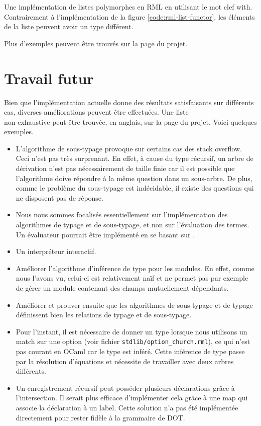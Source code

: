 \begin{listing}
  \inputminted{OCaml}{codes/list.rml}
  \caption{Une implémentation de listes polymorphes en RML en utilisant le mot
    clef with. Contrairement à l'implémentation de la figure
    \ref{code:rml-list-functor}, les éléments de la liste peuvent avoir un type
  différent.}
  \label{code:rml-list-with}
\end{listing}

Plus d'exemples peuvent être trouvés sur la page du projet.

\section{Travail futur}

Bien que l'implémentation actuelle donne des résultats satisfaisants sur
différents cas, diverses améliorations peuvent être effectuées. Une liste \\
non-exhaustive peut être trouvée, en anglais, sur la page du
projet\cite{rml-github-issues}. Voici quelques exemples.

\begin{itemize}
  \item L'algorithme de sous-typage provoque sur certains cas des stack
    overflow. Ceci n'est pas très surprenant. En effet, à cause
    du type récursif, un arbre de dérivation n'est pas nécessairement de taille finie car
    il est possible que l'algorithme doive répondre à la même question dans un
    sous-arbre. De plus, comme le problème du sous-typage est indécidable, il
    existe des questions qui ne disposent pas de réponse.
  \item Nous nous sommes focalisés essentiellement sur l'implémentation des
    algorithmes de typage et de sous-typage, et non sur l'évaluation des termes.
    Un évaluateur pourrait être implémenté en se basant sur \cite{WF-DOT-2016}.
  \item Un interpréteur interactif.
  \item Améliorer l'algorithme d'inférence de type pour les modules. En effet,
      comme nous l'avons vu, celui-ci est relativement naïf et ne permet pas par
      exemple de gérer un module contenant des champs mutuellement dépendants.
  \item Améliorer et prouver ensuite que les algorithmes de sous-typage et de
      typage définissent bien les relations de typage et de sous-typage.
  \item Pour l'instant, il est nécessaire de donner un type lorsque nous
    utilisons un match sur une option (voir fichier \verb|stdlib/option_church.rml|), ce qui
    n'est pas courant en OCaml car le type est inféré. Cette inférence de type
    passe par la résolution d'équations et nécessite de travailler avec deux
    arbres différents.
  \item Un enregistrement récursif peut posséder plusieurs déclarations grâce à
    l'intersection. Il serait plus efficace d'implémenter cela grâce à une map
    qui associe la déclaration à un label. Cette solution n'a pas été
    implémentée directement pour rester fidèle à la grammaire de DOT.
\end{itemize}
